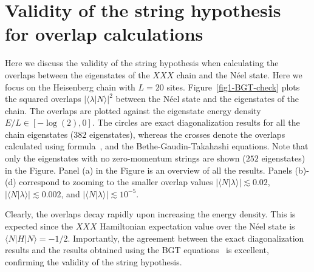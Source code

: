 \documentclass[11pt]{iopart}
\begin{document}
\section{Validity of the string hypothesis for overlap calculations}
\label{string-ov}

Here we discuss the validity of the string hypothesis when calculating the 
overlaps between the eigenstates of the $XXX$ chain and the N\'eel state. 
Here we focus on the Heisenberg chain with $L=20$ sites. 
Figure~\ref{fig1-BGT-check} plots the squared overlaps $|\langle\lambda|
N\rangle|^2$ between the N\'eel state and the eigenstates of the chain. 
The overlaps are plotted against the eigenstate energy density $E/L
\in[-\log(2),0]$. The circles are exact diagonalization results for all 
the chain eigenstates ($382$ eigenstates), whereas the crosses denote the 
overlaps calculated using formula~, and the 
Bethe-Gaudin-Takahashi equations. Note that only the eigenstates with 
no zero-momentum strings are shown ($252$ eigenstates) in the Figure. 
Panel (a) in the Figure is an overview of all the results. Panels (b)-(d) 
correspond to zooming to the smaller overlap values $|\langle N|\lambda
\rangle|\lesssim 0.02$, $|\langle N|\lambda\rangle|\lesssim 0.002$, and 
$|\langle N|\lambda\rangle|\lesssim 10^{-5}$. 

Clearly, the overlaps decay rapidly upon increasing the energy density. 
This is expected since the $XXX$ Hamiltonian expectation value over 
the N\'eel state is $\langle N|{H}|N\rangle=-1/2$. Importantly, the 
agreement between the exact diagonalization results and the results 
obtained using the BGT equations~ is excellent, confirming 
the validity of the string hypothesis. 
\end{document}
